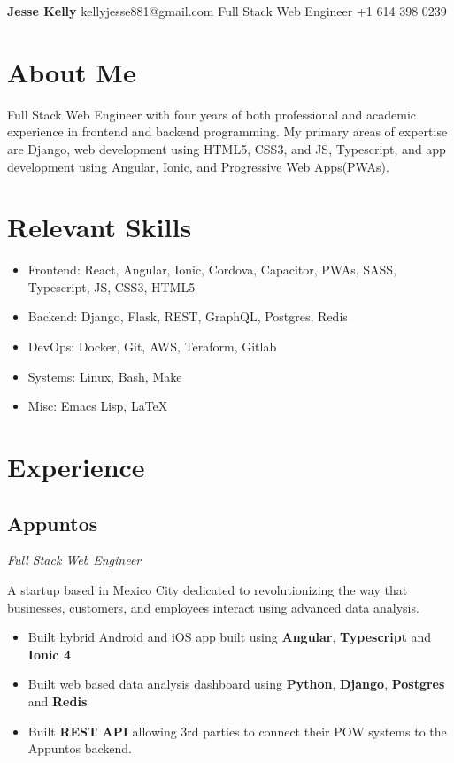 \documentclass[letterpaper,11pt]{article}
\begin{document}
\begin{flushleft}
\Large{\textbf{Jesse Kelly}}
\hfill
kellyjesse881@gmail.com
\newline
Full Stack Web Engineer
\hfill
+1 614 398 0239
\end{flushleft}

\section{About Me}
Full Stack Web Engineer with four years of both
professional and academic experience in frontend
and backend programming. My primary areas of
expertise are Django, web development using HTML5,
CSS3, and JS, Typescript, and app development using
Angular, Ionic, and Progressive Web Apps(PWAs).

\section{Relevant Skills}
\begin{itemize}
\setlength\itemsep{0em}
\item Frontend: React, Angular, Ionic, Cordova, Capacitor, PWAs, SASS, Typescript, JS, CSS3, HTML5
\item Backend: Django, Flask, REST, GraphQL, Postgres, Redis
\item DevOps: Docker, Git, AWS, Teraform, Gitlab
\item Systems: Linux, Bash, Make
\item Misc: Emacs Lisp, \LaTeX
\end{itemize}

\section{Experience}
\subsection{Appuntos}
\textit{Full Stack Web Engineer}
\vspace{2mm}
\begin{adjustwidth}{1cm}{1cm}
  A startup based in Mexico City dedicated to revolutionizing the way that businesses, customers,
  and employees interact using advanced data analysis.

\begin{itemize}
\item Built hybrid Android and iOS app built using \textbf{Angular}, \textbf{Typescript} and \textbf{Ionic 4}
\item Built web based data analysis dashboard using \textbf{Python}, \textbf{Django}, \textbf{Postgres} and \textbf{Redis}
\item Built \textbf{REST API} allowing 3rd parties to connect their POW systems to the Appuntos backend.
\end{itemize}

\end{adjustwidth}
\end{document}
